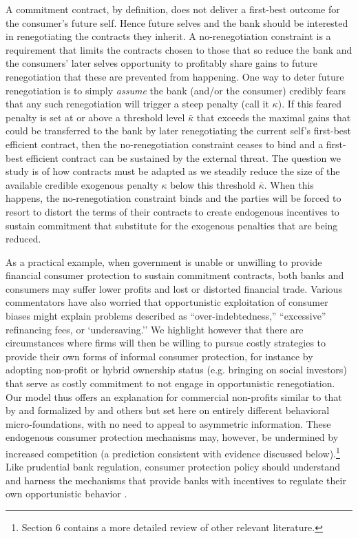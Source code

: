 \documentclass[11pt,english]{article}
\theoremstyle{plain}
\theoremstyle{definition}
\begin{document}
A commitment contract, by definition, does not deliver a first-best
outcome for the consumer's future self. Hence future selves and the
bank should be interested in renegotiating the contracts they inherit. A no-renegotiation
constraint is a requirement that limits the contracts chosen to those that so reduce the bank and the consumers' later
selves opportunity to profitably share gains to future renegotiation that these are prevented from happening. One way
to deter future renegotiation is to simply \textit{assume}  the bank (and/or
the consumer) credibly fears that any such renegotiation will trigger
a steep penalty (call it $\kappa$). If this feared penalty is set
at or above a threshold level $\bar{\kappa}$ that exceeds the maximal
gains that could be transferred to the bank by later renegotiating
the current self's first-best efficient contract, then the no-renegotiation
constraint ceases to bind and a first-best efficient contract can be sustained by the external threat. The question we study is of how contracts must be adapted as we steadily reduce the size of
the available credible exogenous penalty $\kappa$ below
this threshold $\bar{\kappa}$. When this happens, the no-renegotiation
constraint binds and the parties will be forced to resort to distort
the terms of their contracts to create endogenous incentives to sustain
commitment that substitute for the exogenous penalties that are being reduced.

As a practical example, when government is unable or unwilling to
provide financial consumer protection to sustain commitment contracts,
both banks and consumers may suffer lower profits and lost or distorted
financial trade. Various commentators have also worried that opportunistic exploitation of consumer biases  might explain problems described as  ``over-indebtedness,'' ``excessive'' refinancing fees, or `undersaving.'' We highlight however that there are circumstances where firms will
then be willing to pursue costly strategies to provide their own forms
of informal consumer protection, for instance by adopting non-profit or hybrid ownership status (e.g.
bringing on social investors)
that serve as costly commitment to not engage in opportunistic renegotiation. 
Our model thus offers an explanation
for commercial non-profits similar to that by \citet{hansmann1996a}
and formalized by \citet{glaeser2001} and others but set here on
entirely different behavioral micro-foundations, with no need to appeal
to asymmetric information. These endogenous consumer protection mechanisms may,
however, be undermined by increased competition (a prediction consistent with evidence discussed below).\footnote{Section 6 contains a more detailed review of other relevant literature.} Like prudential bank regulation, consumer protection policy should understand and harness the mechanisms that provide  banks with incentives to regulate their own opportunistic behavior  \citep{dewatripont1999}.
\end{document}
